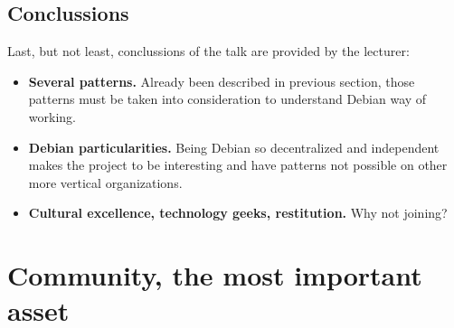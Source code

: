 \documentclass[11pt]{article}
\begin{document}
\subsection{Conclussions}
Last, but not least, conclussions of the talk are provided by the lecturer:
\begin{itemize}\itemsep0pt
\item{\textbf{Several patterns.}} Already been described in previous section, those patterns must be taken into consideration to understand Debian way of working.
\item{\textbf{Debian particularities.}} Being Debian so decentralized and independent makes the project to be interesting and have patterns not possible on other more vertical organizations.
\item{\textbf{Cultural excellence, technology geeks, restitution.}} Why not joining?
\end{itemize}

\pagebreak

\section{Community, the most important asset}
\end{document}
